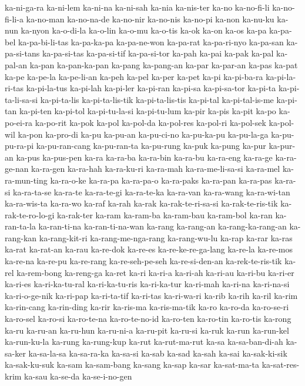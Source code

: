 {ka-ni-ga-ra ka-ni-lem ka-ni-na ka-ni-sah ka-nia ka-nis-ter ka-no
ka-no-fi-li ka-no-fi-li-a ka-no-man ka-no-na-de ka-no-nir ka-no-nis
ka-no-pi ka-non ka-nu-ku ka-nun ka-nyon ka-o-di-la ka-o-lin ka-o-mu
ka-o-tis ka-ok ka-on ka-os ka-pa ka-pa-bel ka-pa-bi-li-tas ka-pa-ka-pa
ka-pa-ne-won ka-pa-rat ka-pa-ri-nyo ka-pa-san ka-pa-si-tans ka-pa-si-tas
ka-pa-si-tif ka-pa-si-tor ka-pah ka-pai ka-pak ka-pal ka-pal-an ka-pan
ka-pan-ka-pan ka-pang ka-pang-an ka-par ka-par-an ka-pas ka-pat ka-pe
ka-pe-la ka-pe-li-an ka-peh ka-pel ka-per ka-pet ka-pi ka-pi-ba-ra
ka-pi-la-ri-tas ka-pi-la-tus ka-pi-lah ka-pi-ler ka-pi-ran ka-pi-sa
ka-pi-sa-tor ka-pi-ta ka-pi-ta-li-sa-si ka-pi-ta-lis ka-pi-ta-lis-tik
ka-pi-ta-lis-tis ka-pi-tal ka-pi-tal-is-me ka-pi-tan ka-pi-ten ka-pi-tol
ka-pi-tu-la-si ka-pi-tu-lum ka-pir ka-pis ka-pit ka-po ka-po-ei-ra
ka-po-rit ka-pok ka-pol ka-pol-da ka-pol-res ka-pol-ri ka-pol-sek
ka-pol-wil ka-pon ka-pro-di ka-pu ka-pu-an ka-pu-ci-no ka-pu-ka-pu
ka-pu-la-ga ka-pu-pu-ra-pi ka-pu-ran-cang ka-pu-ran-ta ka-pu-rung ka-puk
ka-pung ka-pur ka-pur-an ka-pus ka-pus-pen ka-ra ka-ra-ba ka-ra-bin
ka-ra-bu ka-ra-eng ka-ra-ge ka-ra-ge-nan ka-ra-gen ka-ra-hah ka-ra-ku-ri
ka-ra-mah ka-ra-me-li-sa-si ka-ra-mel ka-ra-mun-ting ka-ra-o-ke ka-ra-pa
ka-ra-pa-o ka-ra-paks ka-ra-pan ka-ra-pas ka-ra-si ka-ra-ta-se ka-ra-te
ka-ra-te-gi ka-ra-te-ka ka-ra-van ka-ra-wang ka-ra-wi-tan ka-ra-wis-ta
ka-ra-wo ka-raf ka-rah ka-rak ka-rak-te-ri-sa-si ka-rak-te-ris-tik
ka-rak-te-ro-lo-gi ka-rak-ter ka-ram ka-ram-ba ka-ram-bau ka-ram-bol
ka-ran ka-ran-ta-la ka-ran-ti-na ka-ran-ti-na-wan ka-rang ka-rang-an
ka-rang-ka-rang-an ka-rang-kan ka-rang-kit-ri ka-rang-me-nga-rang
ka-rang-wu-lu ka-rap ka-rar ka-ras ka-rat ka-rat-an ka-rau ka-re-dok
ka-re-es ka-re-ke-re-ga-lang ka-re-la ka-re-mos ka-re-na ka-re-pu
ka-re-rang ka-re-seh-pe-seh ka-re-si-den-an ka-rek-te-ris-tik ka-rel
ka-rem-bong ka-reng-ga ka-ret ka-ri ka-ri-a ka-ri-ah ka-ri-au ka-ri-bu
ka-ri-er ka-ri-es ka-ri-ka-tu-ral ka-ri-ka-tu-ris ka-ri-ka-tur ka-ri-mah
ka-ri-na ka-ri-na-si ka-ri-o-ge-nik ka-ri-pap ka-ri-ta-tif ka-ri-tas
ka-ri-wa-ri ka-rib ka-rih ka-ril ka-rim ka-rin-cang ka-rin-ding ka-rir
ka-ris-ma ka-ris-ma-tik ka-ro ka-ro-da ka-ro-se-ri ka-ro-sel ka-ro-si
ka-ro-te-na ka-ro-te-no-id ka-ro-ten ka-ro-tin ka-ro-tis ka-rong ka-ru
ka-ru-an ka-ru-hun ka-ru-ni-a ka-ru-pit ka-ru-si ka-ruk ka-run ka-run-kel
ka-run-ku-la ka-rung ka-rung-kup ka-rut ka-rut-ma-rut ka-sa
ka-sa-ban-di-ah ka-sa-ker ka-sa-la-sa ka-sa-ra-ka ka-sa-si ka-sab ka-sad
ka-sah ka-sai ka-sak-ki-sik ka-sak-ku-suk ka-sam ka-sam-bang ka-sang
ka-sap ka-sar ka-sat-ma-ta ka-sat-res-krim ka-sau ka-se-da ka-se-i-no-gen
}
